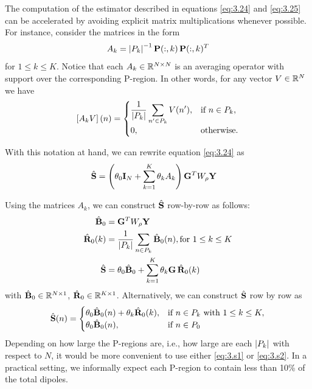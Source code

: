 The computation of the estimator described in equations \eqref{eq:3.24} and \eqref{eq:3.25} can be accelerated by avoiding explicit matrix multiplications whenever possible.
%
For instance, consider the matrices in the form 
\begin{equation}
    A_k = \left| {P_k} \right|^{-1} \mathbf{P}(:,k)\, \mathbf{P}(:,k)^T
\end{equation}
for $1\leq k \leq K$. 
%
Notice that each $A_k \in \mathbb{R}^{N\times N}$ is an averaging operator with support over the corresponding P-region.
%
In other words, for any vector $V\in \mathbb{R}^{N}$ we have
\begin{equation}
    \left[ A_k V \right](n) =
    \begin{cases}
        {\displaystyle \frac{1}{ \left| {P_k} \right| } \sum_{n'\in P_k} V(n')}, 
        &\text{if } n\in P_k, \\
        0, &\text{otherwise}.
    \end{cases}
    \label{eq:4.30}
\end{equation}

With this notation at hand, we can rewrite equation \eqref{eq:3.24} as
\begin{align}
    \hat{\mathbf{S}}
    &=
    \left( \theta_0 \mathbf{I}_N + \sum_{k=1}^K \theta_k A_k \right)\mathbf{G}^T W_\rho \mathbf{Y}
\end{align}


Using the matrices $A_k$, we can construct $\hat{\mathbf{S}}$ row-by-row as follows:
\begin{align}
    \hat{\mathbf{B}}_0
    &=
    \mathbf{G}^T W_\rho \mathbf{Y} \\
    \hat{\mathbf{R}}_0(k)
    &=
    {\displaystyle \frac{1}{\left| {P_k} \right|} \sum_{n\in P_k} \hat{\mathbf{B}}_0(n)},
    \text{for } 1\leq k \leq K
    \\
    \hat{\mathbf{S}}
    &=
    \theta_0 \hat{\mathbf{B}}_0 + 
    \sum_{k=1}^K
    \theta_k \mathbf{G}\, \hat{\mathbf{R}}_0(k)
    \label{eq:3.s1}
\end{align}
with $\hat{\mathbf{B}}_0 \in \mathbb{R}^{N\times 1}$, $\hat{\mathbf{R}}_0 \in \mathbb{R}^{K\times 1}$.
%
Alternatively, we can construct $\hat{\mathbf{S}}$ row by row as
\begin{equation}
    \hat{\mathbf{S}}(n) =
    \begin{cases}
        \theta_0 \hat{\mathbf{B}}_0(n) + \theta_k \hat{\mathbf{R}}_0(k),
        &\text{if } n\in P_k \text{ with } 1\leq k \leq K,
        \\
        \theta_0 \hat{\mathbf{B}}_0(n), &\text{if } n\in P_0
    \end{cases}
    \label{eq:3.s2}
\end{equation}
Depending on how large the P-regions are, i.e., how large are each $\left| {P_k} \right|$ with respect to $N$, it would be more convenient to use
either \eqref{eq:3.s1} or \eqref{eq:3.s2}.
%
In a practical setting, we informally expect each P-region to contain less than 10\% of the total dipoles.

